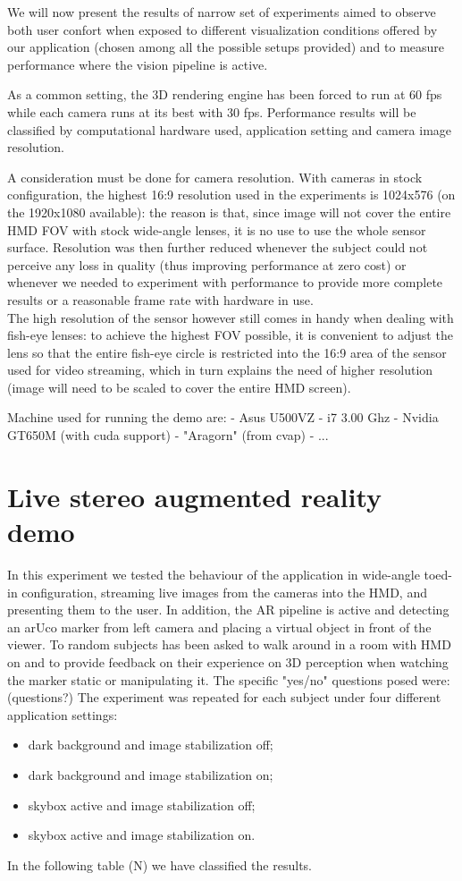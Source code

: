 
We will now present the results of narrow set of experiments aimed to observe both user confort when exposed to different visualization conditions offered by our application (chosen among all the possible setups provided) and to measure performance where the vision pipeline is active.

As a common setting, the 3D rendering engine has been forced to run at 60 fps while each camera runs at its best with 30 fps.  Performance results will be classified by computational hardware used, application setting and camera image resolution.

A consideration must be done for camera resolution. With cameras in stock configuration, the highest 16:9 resolution used in the experiments is 1024x576 (on the 1920x1080 available): the reason is that, since image will not cover the entire HMD FOV with stock wide-angle lenses, it is no use to use the whole sensor surface. Resolution was then further reduced whenever the subject could not perceive any loss in quality (thus improving performance at zero cost) or whenever we needed to experiment with performance to provide more complete results or a reasonable frame rate with hardware in use.\\
The high resolution of the sensor however still comes in handy when dealing with fish-eye lenses: to achieve the highest FOV possible, it is convenient to adjust the lens so that the entire fish-eye circle is restricted into the 16:9 area of the sensor used for video streaming, which in turn explains the need of higher resolution (image will need to be scaled to cover the entire HMD screen).

Machine used for running the demo are:
- Asus U500VZ - i7 3.00 Ghz - Nvidia GT650M (with cuda support)
- "Aragorn" (from cvap) - ...

\section{Live stereo augmented reality demo}
In this experiment we tested the behaviour of the application in wide-angle toed-in configuration, streaming live images from the cameras into the HMD, and presenting them to the user. In addition, the AR pipeline is active and detecting an arUco marker from left camera and placing a virtual object in front of the viewer. To random subjects has been asked to walk around in a room with HMD on and to provide feedback on their experience on 3D perception when watching the marker static or manipulating it. The specific "yes/no" questions posed were:
(questions?)
The experiment was repeated for each subject under four different application settings:
\begin{itemize}
\item dark background and image stabilization off;
\item dark background and image stabilization on;
\item skybox active and image stabilization off;
\item skybox active and image stabilization on.
\end{itemize}
In the following table (N) we have classified the results.

